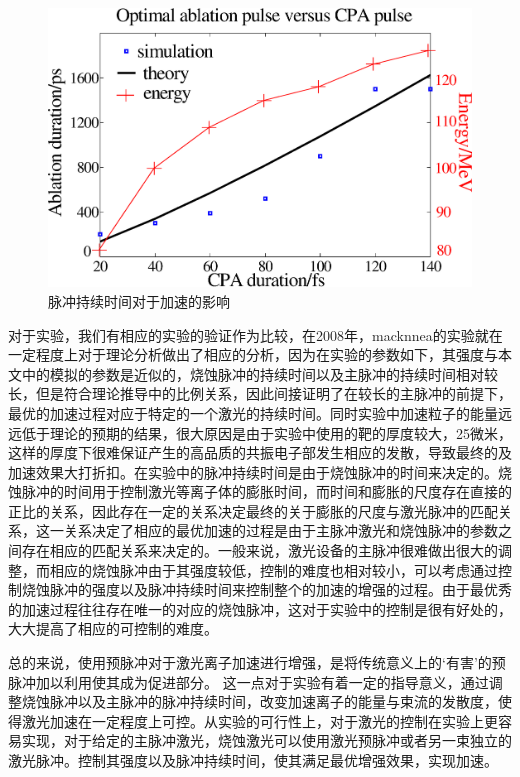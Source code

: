 \begin{figure}[!htbp]
  \centering
  \includegraphics[width=\MyFactor\textwidth]{Img/scanDuration.eps}
  \caption{脉冲持续时间对于加速的影响}
  \label{fig:scanDuration}
\end{figure}



对于实验，我们有相应的实验的验证作为比较，在2008年，macknnea的实验就在一定程度上对于理论分析做出了相应的分析，因为在实验的参数如下，其强度与本文中的模拟的参数是近似的，烧蚀脉冲的持续时间以及主脉冲的持续时间相对较长，但是符合理论推导中的比例关系，因此间接证明了在较长的主脉冲的前提下，最优的加速过程对应于特定的一个激光的持续时间。同时实验中加速粒子的能量远远低于理论的预期的结果，很大原因是由于实验中使用的靶的厚度较大，25微米，这样的厚度下很难保证产生的高品质的共振电子部发生相应的发散，导致最终的及加速效果大打折扣。在实验中的脉冲持续时间是由于烧蚀脉冲的时间来决定的。烧蚀脉冲的时间用于控制激光等离子体的膨胀时间，而时间和膨胀的尺度存在直接的正比的关系，因此存在一定的关系决定最终的关于膨胀的尺度与激光脉冲的匹配关系，这一关系决定了相应的最优加速的过程是由于主脉冲激光和烧蚀脉冲的参数之间存在相应的匹配关系来决定的。一般来说，激光设备的主脉冲很难做出很大的调整，而相应的烧蚀脉冲由于其强度较低，控制的难度也相对较小，可以考虑通过控制烧蚀脉冲的强度以及脉冲持续时间来控制整个的加速的增强的过程。由于最优秀的加速过程往往存在唯一的对应的烧蚀脉冲，这对于实验中的控制是很有好处的，大大提高了相应的可控制的难度。




总的来说，使用预脉冲对于激光离子加速进行增强，是将传统意义上的‘有害’的预脉冲加以利用使其成为促进部分。  这一点对于实验有着一定的指导意义，通过调整烧蚀脉冲以及主脉冲的脉冲持续时间，改变加速离子的能量与束流的发散度，使得激光加速在一定程度上可控。从实验的可行性上，对于激光的控制在实验上更容易实现，对于给定的主脉冲激光，烧蚀激光可以使用激光预脉冲或者另一束独立的激光脉冲。控制其强度以及脉冲持续时间，使其满足最优增强效果，实现加速。




